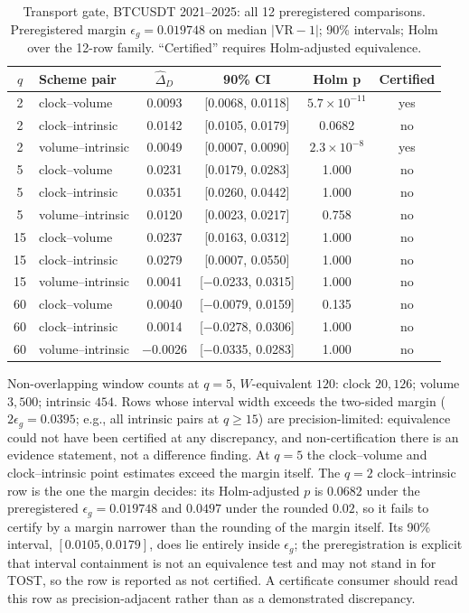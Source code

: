 \documentclass[3p]{elsarticle}
\newcommand{\VR}{\ensuremath{\mathrm{VR}}}
\newcommand{\epsg}{\ensuremath{\epsilon_g}}
\newcommand{\dataspan}{2021--2025}
\begin{document}
\begin{table}[htbp]
\centering
\begin{threeparttable}
\caption{Transport gate, BTCUSDT \dataspan: all 12 preregistered
comparisons. Preregistered margin $\epsg=0.019748$ on median $|\VR-1|$; 90\%
intervals; Holm over the 12-row family. ``Certified'' requires Holm-adjusted
equivalence.}
\label{tab:transport}
\small
\begin{tabular}{c l c c c c}
\toprule
$q$ & Scheme pair & $\widehat{\Delta}_D$ & 90\% CI & Holm p & Certified \\
\midrule
2 & clock--volume & 0.0093 & [0.0068, 0.0118] & $5.7\times10^{-11}$ & yes \\
2 & clock--intrinsic & 0.0142 & [0.0105, 0.0179] & 0.0682 & no \\
2 & volume--intrinsic & 0.0049 & [0.0007, 0.0090] & $2.3\times10^{-8}$ & yes \\
5 & clock--volume & 0.0231 & [0.0179, 0.0283] & 1.000 & no \\
5 & clock--intrinsic & 0.0351 & [0.0260, 0.0442] & 1.000 & no \\
5 & volume--intrinsic & 0.0120 & [0.0023, 0.0217] & 0.758 & no \\
15 & clock--volume & 0.0237 & [0.0163, 0.0312] & 1.000 & no \\
15 & clock--intrinsic & 0.0279 & [0.0007, 0.0550] & 1.000 & no \\
15 & volume--intrinsic & 0.0041 & [$-$0.0233, 0.0315] & 1.000 & no \\
60 & clock--volume & 0.0040 & [$-$0.0079, 0.0159] & 0.135 & no \\
60 & clock--intrinsic & 0.0014 & [$-$0.0278, 0.0306] & 1.000 & no \\
60 & volume--intrinsic & $-$0.0026 & [$-$0.0335, 0.0283] & 1.000 & no \\
\bottomrule
\end{tabular}
\begin{tablenotes}\footnotesize
\item Non-overlapping window counts at $q{=}5$, $W$-equivalent $120$: clock
$20{,}126$; volume $3{,}500$; intrinsic $454$. Rows whose interval width
exceeds the two-sided margin ($2\epsg=0.0395$; e.g., all intrinsic pairs at
$q\ge15$) are precision-limited: equivalence could not have been certified
at any discrepancy, and non-certification there is an evidence statement,
not a difference finding. At $q{=}5$ the clock--volume and clock--intrinsic
point estimates exceed the margin itself. The $q{=}2$ clock--intrinsic row
is the one the margin decides: its Holm-adjusted $p$ is $0.0682$ under the
preregistered $\epsg=0.019748$ and $0.0497$ under the rounded $0.02$, so it
fails to certify by a margin narrower than the rounding of the margin
itself. Its 90\% interval, $[0.0105, 0.0179]$, does lie entirely inside
$\epsg$; the preregistration is explicit that interval containment is not an
equivalence test and may not stand in for TOST, so the row is reported as not
certified. A certificate consumer should read this row as
precision-adjacent rather than as a demonstrated discrepancy.
\end{tablenotes}
\end{threeparttable}
\end{table}
\end{document}
